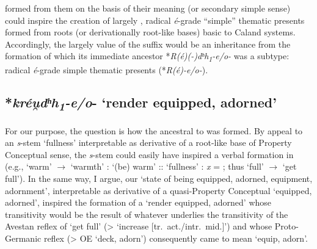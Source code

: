 \documentclass[output=paper,colorlinks,citecolor=brown]{langscibook}
\begin{document}
formed from them on the basis of their   meaning (or secondary simple  sense) could inspire the creation of largely , radical \textit{é}-grade “simple” thematic presents  formed from roots (or derivationally root-like bases) basic to Caland systems.  Accordingly, the largely  value of the suffix  would be an inheritance from the formation of which its immediate ancestor *\textit{R(é)(-)dʰh\textsubscript{1}-e/o-} was a subtype: radical \textit{é}-grade simple thematic presents  (*\textit{R(é)-e/o-}).

\subsection{*\textit{kréu̯dʰh\textsubscript{1}-e/o}- ‘render equipped, adorned’}


For our purpose, the question is how the  ancestral to   was formed. By appeal to an \textit{s}-stem  ‘fullness’ interpretable as derivative of a root-like base  of Property Conceptual sense, the \textit{s}-stem could easily have inspired a verbal formation in  (e.g.,  ‘warm’ $\rightarrow$  ‘warmth’ :  ‘(be) warm’ ::  ‘fullness’ : \textit{x} = ; thus  ‘full’ $\rightarrow$  ‘get full’). In the same way, I argue, our  ‘state of being equipped, adorned, equipment, adornment’, interpretable as derivative of a quasi-Property Conceptual  ‘equipped, adorned’, inspired the formation of a  ‘render equipped, adorned’ whose transitivity would be the result of whatever underlies the transitivity of the Avestan reflex of  ‘get full’ (>  ‘increase [tr.\ act./intr.\ mid.]’) and whose Proto-Germanic reflex  (> OE  ‘deck, adorn’) consequently came to mean ‘equip, adorn’.
\end{document}
